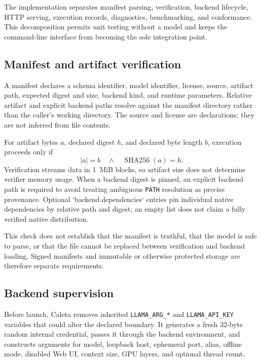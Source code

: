\documentclass[11pt,a4paper]{article}
\begin{document}
The implementation separates manifest parsing, verification, backend lifecycle, HTTP serving, execution records, diagnostics, benchmarking, and conformance. This decomposition permits unit testing without a model and keeps the command-line interface from becoming the sole integration point.

\subsection{Manifest and artifact verification}

A manifest declares a schema identifier, model identifier, license, source, artifact path, expected digest and size, backend kind, and runtime parameters. Relative artifact and explicit backend paths resolve against the manifest directory rather than the caller's working directory. The source and license are declarations; they are not inferred from file contents.

For artifact bytes $a$, declared digest $h$, and declared byte length $b$, execution proceeds only if
\begin{equation}
|a| = b \quad \land \quad \operatorname{SHA256}(a) = h.
\end{equation}
Verification streams data in 1~MiB blocks, so artifact size does not determine verifier memory usage. When a backend digest is pinned, an explicit backend path is required to avoid treating ambiguous \texttt{PATH} resolution as precise provenance. Optional `backend.dependencies` entries pin individual native dependencies by relative path and digest; an empty list does not claim a fully verified native distribution.

This check does not establish that the manifest is truthful, that the model is safe to parse, or that the file cannot be replaced between verification and backend loading. Signed manifests and immutable or otherwise protected storage are therefore separate requirements.

\subsection{Backend supervision}

Before launch, Caleta removes inherited \texttt{LLAMA\_ARG\_*} and \texttt{LLAMA\_API\_KEY} variables that could alter the declared boundary. It generates a fresh 32-byte random internal credential, passes it through the backend environment, and constructs arguments for model, loopback host, ephemeral port, alias, offline mode, disabled Web UI, context size, GPU layers, and optional thread count.
\end{document}
